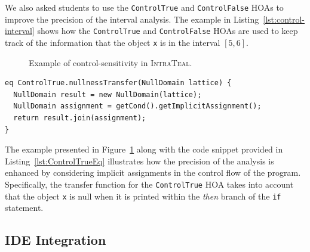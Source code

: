We also asked students to use the \texttt{ControlTrue} and \texttt{ControlFalse} HOAs to improve the precision of the interval analysis.
The example in Listing~\ref{lst:control-interval} shows how the \texttt{ControlTrue} and \texttt{ControlFalse}
HOAs are used to keep track of the information that the object \texttt{x} is in the interval $[5,6]$.
\begin{figure}
	\centering
	\caption{\label{fig:ExampleTEAL} Example of control-sensitivity in \textsc{IntraTeal}.}
\end{figure}
\begin{lstlisting}[language=JastAdd,label={lst:ControlTrueEq}, caption={Transfer function for \texttt{ControlTrue} HOA.}]
eq ControlTrue.nullnessTransfer(NullDomain lattice) {
  NullDomain result = new NullDomain(lattice);
  NullDomain assignment = getCond().getImplicitAssignment();
  return result.join(assignment);
}
\end{lstlisting}
The example presented in Figure~\ref{fig:ExampleTEAL} along with the code snippet
provided in Listing~\ref{lst:ControlTrueEq} illustrates how the precision of the
analysis is enhanced by considering implicit assignments in the control flow of 
the program. Specifically, the transfer function for the \texttt{ControlTrue} HOA
takes into account that the object \texttt{x} is null when it is printed within 
the \emph{then} branch of the \texttt{if} statement.


\subsection{IDE Integration}
